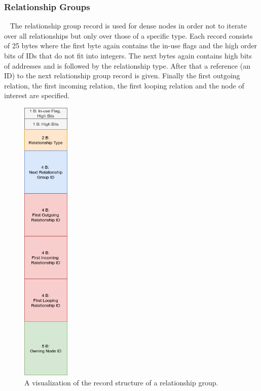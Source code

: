\documentclass[a4paper,10pt]{article}
\begin{document}
        \subsubsection{Relationship Groups}~\label{rel_group}
            The relationship group record is used for dense nodes in order not to iterate over all relationships but only over those of a specific type.
            Each record consists of 25 bytes where the first byte again contains the in-use flags and the high order bits of IDs that do not fit into integers.
            The next bytes again contains high bits of addresses and is followed by the relationship type.
            After that a reference (an ID) to the next relationship group record is given.
            Finally the first outgoing relation, the first incoming relation, the first looping relation and the node of interest are specified.
        
            \begin{figure}[htp]\label{rel_group_record}
                \begin{center}
                    \includegraphics[keepaspectratio,height=0.2\textheight,width=0.2\textwidth]{img/03_record/relationship/relationship_group_record.png}
                \end{center}
                \caption{A visualization of the record structure of a relationship group.} %
            \end{figure}
        
\end{document}
